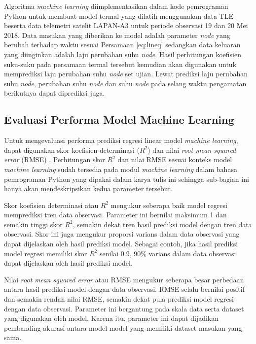 Algoritma \textit{machine learning} diimplementasikan dalam kode pemrograman
Python untuk membuat model termal yang dilatih menggunakan data TLE beserta
data telemetri satelit LAPAN-A3 untuk periode observasi 19 dan 20 Mei 2018.
Data masukan yang diberikan ke model adalah parameter \textit{node} yang
berubah terhadap waktu sesuai Persamaan \ref{eq:lineq} sedangkan data keluaran
yang diinginkan adalah laju perubahan suhu \textit{node}. Hasil perhitungan
koefisien suku-suku pada persamaan termal tersebut kemudian akan digunakan
untuk memprediksi laju perubahan suhu \textit{node} set ujian. Lewat
prediksi laju perubahan suhu \textit{node}, perubahan suhu \textit{node} dan
suhu \textit{node} pada selang waktu pengamatan berikutnya dapat diprediksi
juga.

\subsection{Evaluasi Performa Model Machine Learning}

Untuk mengevaluasi performa prediksi regresi linear model \textit{machine
learning}, dapat digunakan skor koefisien determinasi ($R^2$) \cite{gupta2021}
dan nilai \textit{root mean squared error} (RMSE) \cite{zheng}. Perhitungan
skor $R^2$ dan nilai RMSE sesuai konteks model \textit{machine learning} sudah
tersedia pada modul \textit{machine learning} dalam bahasa pemrograman Python
yang dipakai dalam karya tulis ini sehingga sub-bagian ini hanya akan
mendeskripsikan kedua parameter tersebut.

Skor koefisien determinasi atau $R^2$ mengukur seberapa baik model regresi
memprediksi tren data observasi. Parameter ini bernilai maksimum 1 dan semakin
tinggi skor $R^2$, semakin dekat tren hasil prediksi model dengan tren data
observasi. Skor ini juga mengukur proporsi varians dalam data observasi yang
dapat dijelaskan oleh hasil prediksi model. Sebagai contoh, jika hasil prediksi
model regresi memiliki skor $R^2$ senilai 0.9, 90\% varians dalam data
observasi dapat dijelaskan oleh hasil prediksi model.

Nilai \textit{root mean squared error} atau RMSE mengukur seberapa besar
perbedaan antara hasil prediksi model dengan data observasi. RMSE selalu
bernilai positif dan semakin rendah nilai RMSE, semakin dekat pula prediksi
model regresi dengan data observasi. Parameter ini bergantung pada skala data
serta dataset yang digunakan oleh model. Karena itu, parameter ini dapat
dijadikan pembanding akurasi antara model-model yang memiliki dataset masukan
yang sama.

